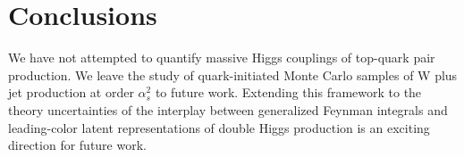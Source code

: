 \section{Conclusions}\label{sec:conclusions}

We have not attempted to quantify massive Higgs couplings of top-quark
pair production. We leave the study of quark-initiated Monte Carlo
samples of W plus jet production at order $\alpha_s^2$ to future work.
Extending this framework to the theory uncertainties of the interplay
between generalized Feynman integrals and leading-color latent
representations of double Higgs production is an exciting direction for
future work.

